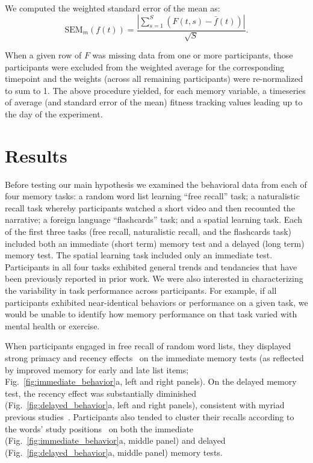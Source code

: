 \documentclass[10pt]{article}
\begin{document}
We computed the weighted standard error of the mean as:
\[
\mathrm{SEM}_m\left(f(t)\right) = \frac{\left| \sum_{s=1}^S \left( F(t, s) -
    \bar{f}(t)\right) \right|}{\sqrt{S}}.
\]

When a given row of $F$ was missing data from one or more
participants, those participants were excluded from the weighted
average for the corresponding timepoint and the weights (across all
remaining participants) were re-normalized to sum to 1.  The above
procedure yielded, for each memory variable, a timeseries of average
(and standard error of the mean) fitness tracking values leading up to
the day of the experiment.

\section*{Results}
Before testing our main hypothesis we examined the behavioral data
from each of four memory tasks: a random word list learning ``free
recall'' task; a naturalistic recall task whereby participants watched
a short video and then recounted the narrative; a foreign language
``flashcards'' task; and a spatial learning task.  Each of the first
three tasks (free recall, naturalistic recall, and the flashcards
task) included both an immediate (short term) memory test and a
delayed (long term) memory test.  The spatial learning task included
only an immediate test. Participants in all four tasks exhibited
general trends and tendancies that have been previously reported in
prior work.  We were also interested in characterizing the variability
in task performance across participants.  For example, if all
participants exhibited near-identical behaviors or performance on a
given task, we would be unable to identify how memory performance on
that task varied with mental health or exercise.

When participants engaged in free recall of random word lists, they
displayed strong primacy and recency effects~\citep{Murd62a} on the
immediate memory tests (as reflected by improved memory for early and
late list items; Fig.~\ref{fig:immediate_behavior}a, left and right
panels).  On the delayed memory test, the recency effect was
substantially diminished (Fig.~\ref{fig:delayed_behavior}a, left and
right panels), consistent with myriad previous studies~\citep[for
review see][]{Kaha12}.  Participants also tended to cluster their
recalls according to the words' study positions~\citep{Kaha96} on both
the immediate (Fig.~\ref{fig:immediate_behavior}a, middle panel) and
delayed (Fig.~\ref{fig:delayed_behavior}a, middle panel) memory tests.
\end{document}
